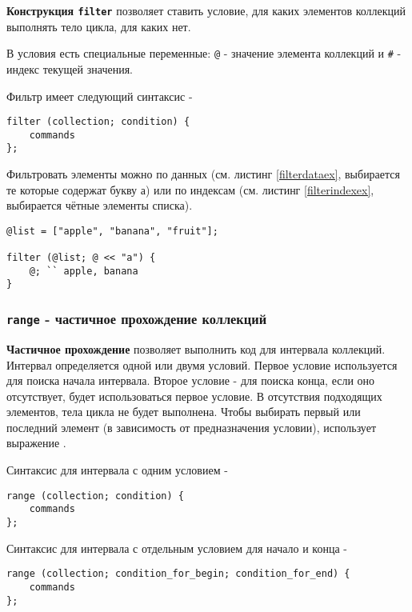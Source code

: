 {\bf Конструкция \texttt{filter}} позволяет ставить условие, для каких элементов коллекций выполнять тело цикла, для каких нет.

В условия есть специальные переменные: \texttt{@} - значение элемента коллекций и \texttt{#} - индекс текущей значения.

Фильтр имеет следующий синтаксис -
\begin{verbatim}
filter (collection; condition) {
	commands
};
\end{verbatim}

Фильтровать элементы можно по данных (см. листинг \ref{filterdataex}, выбирается те которые содержат букву а) или по индексам (см. листинг \ref{filterindexex}, выбирается чётные элементы списка).

\begin{sourcecode}
\label{filterdataex}
\begin{verbatim}
@list = ["apple", "banana", "fruit"];

filter (@list; @ << "a") {
	@; `` apple, banana
}
\end{verbatim}
\end{sourcecode}

\subsubsection{\texttt{range} - частичное прохождение коллекций}

{\bf Частичное прохождение} позволяет выполнить код для интервала коллекций. Интервал определяется одной или двумя условий. Первое условие используется для поиска начала интервала. Второе условие - для поиска конца, если оно отсутствует, будет использоваться первое условие. В отсутствия подходящих элементов, тела цикла не будет выполнена. Чтобы выбирать первый или последний элемент (в зависимость от предназначения условии), использует выражение \true{}.

Синтаксис для интервала с одним условием -
\begin{verbatim}
range (collection; condition) {
	commands
};
\end{verbatim}

Синтаксис для интервала с отдельным условием для начало и конца -
\begin{verbatim}
range (collection; condition_for_begin; condition_for_end) {
	commands
};
\end{verbatim}

